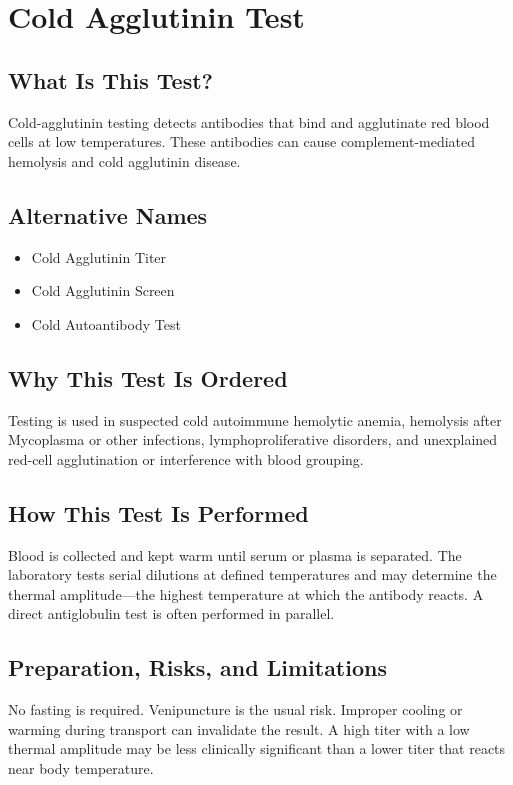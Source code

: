 \chapter{Cold Agglutinin Test}

\section*{What Is This Test?}
Cold-agglutinin testing detects antibodies that bind and agglutinate red blood cells at low temperatures. These antibodies can cause complement-mediated hemolysis and cold agglutinin disease.

\section*{Alternative Names}
\begin{itemize}
  \item Cold Agglutinin Titer
  \item Cold Agglutinin Screen
  \item Cold Autoantibody Test
\end{itemize}
\section*{Why This Test Is Ordered}
Testing is used in suspected cold autoimmune hemolytic anemia, hemolysis after Mycoplasma or other infections, lymphoproliferative disorders, and unexplained red-cell agglutination or interference with blood grouping.

\section*{How This Test Is Performed}
Blood is collected and kept warm until serum or plasma is separated. The laboratory tests serial dilutions at defined temperatures and may determine the thermal amplitude---the highest temperature at which the antibody reacts. A direct antiglobulin test is often performed in parallel.

\section*{Preparation, Risks, and Limitations}
No fasting is required. Venipuncture is the usual risk. Improper cooling or warming during transport can invalidate the result. A high titer with a low thermal amplitude may be less clinically significant than a lower titer that reacts near body temperature.

